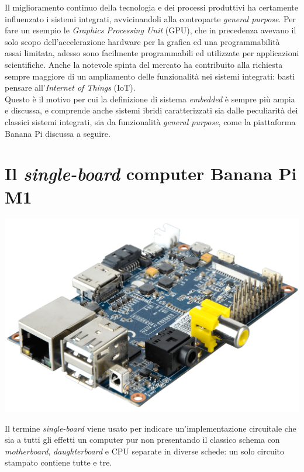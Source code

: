 Il miglioramento continuo della tecnologia e dei processi produttivi ha 
certamente influenzato i sistemi integrati, avvicinandoli alla controparte 
\emph{general purpose}. Per fare un esempio le \emph{Graphics Processing Unit} 
(GPU), 
che in precedenza avevano il solo 
scopo dell'accelerazione hardware per la grafica ed una programmabilità assai 
limitata, adesso sono facilmente programmabili ed utilizzate per applicazioni 
scientifiche. Anche la notevole spinta del mercato ha 
contribuito alla richiesta sempre maggiore di un ampliamento delle 
funzionalità nei sistemi integrati: basti pensare all'\emph{Internet of 
Things} (IoT). \\
Questo è il motivo per cui la definizione di sistema \emph{embedded} è sempre 
più ampia e discussa, e comprende anche sistemi ibridi caratterizzati sia 
dalle peculiarità dei classici sistemi integrati, sia da funzionalità 
\emph{general purpose}, come la piattaforma Banana Pi discussa a seguire.

\newpage
\section{Il \emph{single-board} computer Banana Pi M1}
\begin{center}
\includegraphics[scale=0.175]{Figures/bananapi.png}\\
\end{center}
Il termine \emph{single-board} viene usato per indicare un'implementazione 
circuitale che sia a tutti gli effetti un computer pur non presentando il 
classico schema con \emph{motherboard}, \emph{daughterboard} e CPU separate in 
diverse schede: un solo circuito stampato contiene tutte e tre.

